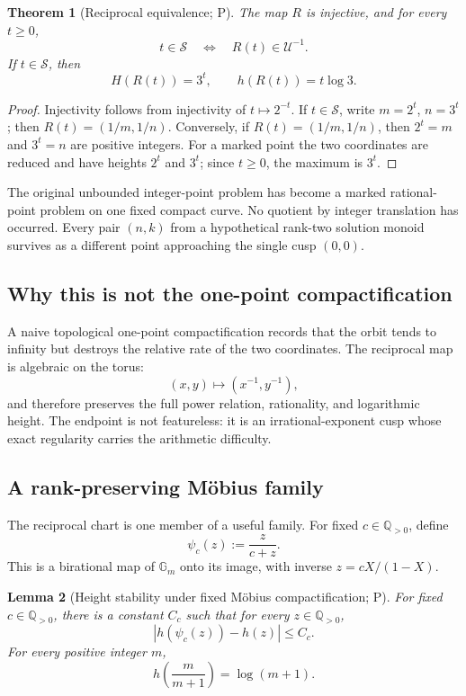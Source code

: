 \documentclass[10pt,oneside]{article}
\newtheorem{theorem}{Theorem}[section]
\newtheorem{lemma}[theorem]{Lemma}
\theoremstyle{definition}
\theoremstyle{remark}
\newcommand{\Q}{\mathbb Q}
\newcommand{\Gm}{\mathbb G_m}
\newcommand{\Sol}{\mathcal S}
\newcommand{\unitrec}{\mathcal U^{-1}}
\newcommand{\statusP}{\textsc{P}}
\begin{document}
\begin{theorem}[Reciprocal equivalence; \statusP]
\label{thm:reciprocal-equivalence}
The map \(R\) is injective, and for every \(t\ge0\),
\[
 t\in\Sol
 \quad\Longleftrightarrow\quad
 R(t)\in\unitrec.
\]
If \(t\in\Sol\), then
\[
 H(R(t))=3^t,
 \qquad
 h(R(t))=t\log3.
\]
\end{theorem}

\begin{proof}
Injectivity follows from injectivity of \(t\mapsto2^{-t}\).  If \(t\in\Sol\), write \(m=2^t\), \(n=3^t\); then \(R(t)=(1/m,1/n)\).  Conversely, if \(R(t)=(1/m,1/n)\), then \(2^t=m\) and \(3^t=n\) are positive integers.  For a marked point the two coordinates are reduced and have heights \(2^t\) and \(3^t\); since \(t\ge0\), the maximum is \(3^t\).
\end{proof}

\begin{provedbox}
The original unbounded integer-point problem has become a marked rational-point problem on one fixed compact curve.  No quotient by integer translation has occurred.  Every pair \((n,k)\) from a hypothetical rank-two solution monoid survives as a different point approaching the single cusp \((0,0)\).
\end{provedbox}

\subsection{Why this is not the one-point compactification}
A naive topological one-point compactification records that the orbit tends to infinity but destroys the relative rate of the two coordinates.  The reciprocal map is algebraic on the torus:
\[
 (x,y)\longmapsto(x^{-1},y^{-1}),
\]
and therefore preserves the full power relation, rationality, and logarithmic height.  The endpoint is not featureless: it is an irrational-exponent cusp whose exact regularity carries the arithmetic difficulty.

\subsection{A rank-preserving Möbius family}
The reciprocal chart is one member of a useful family.  For fixed \(c\in\Q_{>0}\), define
\[
 \psi_c(z):=\frac{z}{c+z}.
\]
This is a birational map of \(\Gm\) onto its image, with inverse \(z=cX/(1-X)\).

\begin{lemma}[Height stability under fixed Möbius compactification; \statusP]
\label{lem:mobius-height}
For fixed \(c\in\Q_{>0}\), there is a constant \(C_c\) such that for every \(z\in\Q_{>0}\),
\[
 |h(\psi_c(z))-h(z)|\le C_c.
\]
For every positive integer \(m\),
\[
 h\!\left(\frac{m}{m+1}\right)=\log(m+1).
\]
\end{lemma}
\end{document}
